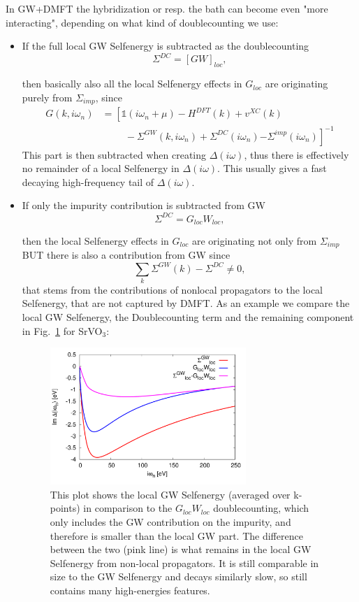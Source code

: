 \documentclass[12pt,a4paper]{scrartcl}
\numberwithin{equation}{section}
\newcommand{\unity}{\mathds{1}}
\begin{document}
In GW+DMFT the hybridization or resp. the bath can become even "more interacting",
depending on what kind of doublecounting we use:
\begin{itemize}
\item If the full local GW Selfenergy is subtracted as the doublecounting
\[
\Sigma^{DC} = \left[GW \right]_{loc},
\]

then basically also all the local Selfenergy effects in $G_{loc}$ are 
originating purely from $\Sigma_{imp}$, since 
\begin{align}
 G(k,i\omega_n) 
 &= \left[ \unity(i\omega_n+\mu ) -H^{DFT}(k) + v^{XC}(k) \right. \nonumber \\
          & \hspace{1cm}- \Sigma^{GW}(k,i\omega_n) 
          + \Sigma^{DC}(i\omega_n)
          \left. - \Sigma^{imp}(i\omega_n)
           \right]^{-1} 
%
\end{align}
 This part is then subtracted
when creating $\Delta(i\omega)$, thus there is effectively no remainder of a 
local Selfenergy in $\Delta(i\omega)$. This usually gives a fast
decaying high-frequency tail of $\Delta(i\omega)$.

\item If only the impurity contribution is subtracted from GW
\[
\Sigma^{DC} = G_{loc}W_{loc},
\]

then the local Selfenergy effects in $G_{loc}$ are 
originating not only from $\Sigma_{imp}$ BUT there is also
a contribution from GW since
\[
\sum_k \Sigma^{GW}(k) - \Sigma^{DC} \neq 0,
\]
that stems from the contributions of nonlocal propagators
to the local Selfenergy, that are not captured by DMFT.
As an example we compare the local GW Selfenergy, the Doublecounting term
and the remaining component in Fig.~\ref{fig:Sigma_compare_loc_GW_DC}
for SrVO$_3$:
\begin{figure}[h]
\begin{center}
\includegraphics[width=0.7\textwidth]{figs/SrVO3_s_gw_DC.pdf} 
\end{center}
\caption{This plot shows the local GW Selfenergy (averaged over k-points)
in comparison to the $G_{loc}W_{loc}$ doublecounting, which only includes
the GW contribution on the impurity, and therefore is smaller
than the local GW part.
The difference between the two (pink line) is what remains in the local
GW Selfenergy from non-local propagators. It is still comparable in
size to the GW Selfenergy and decays similarly slow, so still
contains many high-energies features.}
\label{fig:Sigma_compare_loc_GW_DC}
\end{figure}


\end{itemize}
\end{document}
